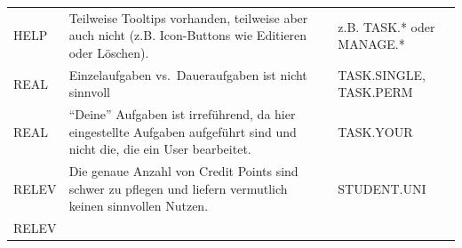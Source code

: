 \documentclass[
  12pt,
  ngerman,
  a4paper,
]{article}
\begin{document}
\begin{longtable}[]{@{}lll@{}}
\begin{minipage}[t]{0.14\columnwidth}\raggedright
HELP\strut
\end{minipage} & \begin{minipage}[t]{0.55\columnwidth}\raggedright
Teilweise Tooltips vorhanden, teilweise aber auch nicht (z.B.
Icon-Buttons wie Editieren oder Löschen).\strut
\end{minipage} & \begin{minipage}[t]{0.23\columnwidth}\raggedright
z.B. TASK.* oder MANAGE.*\strut
\end{minipage}\tabularnewline
\begin{minipage}[t]{0.14\columnwidth}\raggedright
REAL\strut
\end{minipage} & \begin{minipage}[t]{0.55\columnwidth}\raggedright
Einzelaufgaben vs.~Daueraufgaben ist nicht sinnvoll\strut
\end{minipage} & \begin{minipage}[t]{0.23\columnwidth}\raggedright
TASK.SINGLE, TASK.PERM\strut
\end{minipage}\tabularnewline
\begin{minipage}[t]{0.14\columnwidth}\raggedright
REAL\strut
\end{minipage} & \begin{minipage}[t]{0.55\columnwidth}\raggedright
``Deine'' Aufgaben ist irreführend, da hier eingestellte Aufgaben
aufgeführt sind und nicht die, die ein User bearbeitet.\strut
\end{minipage} & \begin{minipage}[t]{0.23\columnwidth}\raggedright
TASK.YOUR\strut
\end{minipage}\tabularnewline
\begin{minipage}[t]{0.14\columnwidth}\raggedright
RELEV\strut
\end{minipage} & \begin{minipage}[t]{0.55\columnwidth}\raggedright
Die genaue Anzahl von Credit Points sind schwer zu pflegen und liefern
vermutlich keinen sinnvollen Nutzen.\strut
\end{minipage} & \begin{minipage}[t]{0.23\columnwidth}\raggedright
STUDENT.UNI\strut
\end{minipage}\tabularnewline
\begin{minipage}[t]{0.14\columnwidth}\raggedright
RELEV\strut
\end{minipage} & \begin{minipage}[t]{0.55\columnwidth}\raggedright

\end{minipage}
\end{longtable}
\end{document}
